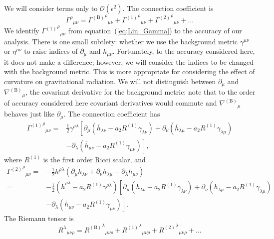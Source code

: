 \documentclass[a4paper, 11pt, titlepage, twoside]{report}
\newcommand{\eqnref}[1]{equation~(\ref{eq:#1})}
\newcommand{\order}[1]{\ensuremath{\mathcal{O}({#1})}}
\begin{document}
We will consider terms only to $\order{\epsilon^2}$. The connection coefficient is
\begin{equation}
{\Gamma^\rho}_{\mu\nu} = {{\Gamma^{(\mathrm{B})}}^\rho}_{\mu\nu} + {{\Gamma^{(1)}}^\rho}_{\mu\nu} + {{\Gamma^{(2)}}^\rho}_{\mu\nu} + \ldots
\end{equation}
We identify ${{\Gamma^{(1)}}^\rho}_{\mu\nu}$ from \eqnref{Lin_Gamma} to the accuracy of our analysis. There is one small subtlety: whether we use the background metric $\gamma^{\mu\nu}$ or $\eta^{\mu\nu}$ to raise indices of $\partial_\mu$ and $h_{\mu\nu}$. Fortunately, to the accuracy considered here, it does not make a difference; however, we will consider the indices to be changed with the background metric. This is more appropriate for considering the effect of curvature on gravitational radiation. We will not distinguish between $\partial_\mu$ and ${\nabla^{(\mathrm{B})}}_\mu$, the covariant derivative for the background metric: note that to the order of accuracy considered here covariant derivatives would commute and ${\nabla^{(\mathrm{B})}}_\mu$ behaves just like $\partial_\mu$. The connection coefficient has
\begin{align}
{{\Gamma^{(1)}}^\rho}_{\mu\nu} = {} & \frac{1}{2}\gamma^{\rho\lambda}\left[\partial_\mu \left(\overline{h}_{\lambda\nu} - a_2 R^{(1)}\gamma_{\lambda\nu}\right) + \partial_\nu \left(\overline{h}_{\lambda\mu} - a_2 R^{(1)}\gamma_{\lambda\mu}\right) \right. \nonumber \\
  & - \left. \partial_\lambda \left(\overline{h}_{\mu\nu} - a_2 R^{(1)}\gamma_{\mu\nu}\right)\right],
\end{align}
where $R^{(1)}$ is the first order Ricci scalar, and
\begin{align}
{{\Gamma^{(2)}}^\rho}_{\mu\nu} = {} & -\frac{1}{2}h^{\rho\lambda}(\partial_\mu h_{\lambda\nu} + \partial_\nu h_{\lambda\mu} - \partial_\lambda h_{\mu\nu}) \nonumber \\
 = {} & -\frac{1}{2}\left(\overline{h}^{\rho\lambda} - a_2 R^{(1)}\gamma^{\rho\lambda}\right)\left[\partial_\mu \left(\overline{h}_{\lambda\nu} - a_2 R^{(1)}\gamma_{\lambda\nu}\right) + \partial_\nu \left(\overline{h}_{\lambda\mu} - a_2 R^{(1)}\gamma_{\lambda\mu}\right) \right. \nonumber \\
 & - \left. \partial_\lambda \left(\overline{h}_{\mu\nu} - a_2 R^{(1)}\gamma_{\mu\nu}\right)\right].
\end{align}
The Riemann tensor is
\begin{equation}
{R^\lambda}_{\mu\nu\rho} = {{R^{(\mathrm{B})}}^\lambda}_{\mu\nu\rho} + {{R^{(1)}}^\lambda}_{\mu\nu\rho} + {{R^{(2)}}^\lambda}_{\mu\nu\rho} + \ldots
\end{equation}
\end{document}
